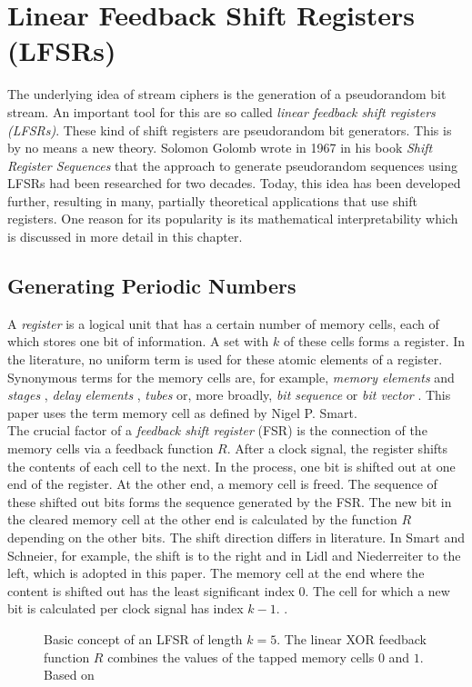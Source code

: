 \section{Linear Feedback Shift Registers (LFSRs)}
The underlying idea of stream ciphers is the generation of a pseudorandom bit stream. An important tool for this are so called \textit{linear feedback shift registers (LFSRs)}. These kind of shift registers are pseudorandom bit generators. This is by no means a new theory. Solomon Golomb wrote in 1967 in his book \textit{Shift Register Sequences} that the approach to generate pseudorandom sequences using LFSRs had been researched for two decades. \cite[p. 2]{Golomb.1967} Today, this idea has been developed further, resulting in many, partially theoretical applications that use shift registers. One reason for its popularity is its mathematical interpretability which is discussed in more detail in this chapter. 

\subsection{Generating Periodic Numbers}
A \textit{register} is a logical unit that has a certain number of memory cells, each of which stores one bit of information. A set with $k$ of these cells forms a register. In the literature, no uniform term is used for these atomic elements of a register. Synonymous terms for the memory cells are, for example, \textit{memory elements} and \textit{stages} \cite[p. 81]{Stamp.2007}, \textit{delay elements} \cite[pp. 186-187]{Lidl.1986}, \textit{tubes} \cite[p. 27]{Golomb.1967} or, more broadly, \textit{bit sequence} \cite[p. 429]{Schneier.2006} or \textit{bit vector} \cite[p. 198]{Ertel.2020}. This paper uses the term memory cell as defined by Nigel P. Smart. \cite[p. 227]{Smart.2016} \\

The crucial factor of a \textit{feedback shift register} (FSR) is the connection of the memory cells via a feedback function $R$. After a clock signal, the register shifts the contents of each cell to the next. In the process, one bit is shifted out at one end of the register. At the other end, a memory cell is freed. The sequence of these shifted out bits forms the sequence generated by the FSR. The new bit in the cleared memory cell at the other end is calculated by the function $R$ depending on the other bits. The shift direction differs in literature. In Smart and Schneier, for example, the shift is to the right \cite[p. 227]{Smart.2016}\cite[p. 429]{Schneier.2006} and in Lidl and Niederreiter to the left, which is adopted in this paper. The memory cell at the end where the content is shifted out has the least significant index $0$. The cell for which a new bit is calculated per clock signal has index $k-1$. \cite[pp. 186-187]{Lidl.1986}.
\begin{figure}[h]
	\centering
	
	\caption{Basic concept of an LFSR of length $k=5$. The linear XOR feedback function $R$ combines the values of the tapped memory cells $0$ and $1$. Based on \cite[p. 430]{Schneier.2006}}
	\label{fig:Figure_3}
\end{figure}

